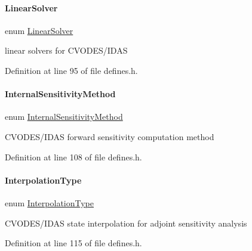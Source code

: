 \paragraph{\texorpdfstring{Linear\+Solver}{LinearSolver}}
{\footnotesize\ttfamily enum \mbox{\hyperlink{namespaceamici_a1a6a4776314a0843143e5631c3ce21a7}{Linear\+Solver}}\hspace{0.3cm}{\ttfamily [strong]}}

linear solvers for C\+V\+O\+D\+E\+S/\+I\+D\+AS 

Definition at line 95 of file defines.\+h.

\mbox{\label{namespaceamici_aa444c52f0a5638d68702d1ec92f8db87}} 
\paragraph{\texorpdfstring{Internal\+Sensitivity\+Method}{InternalSensitivityMethod}}
{\footnotesize\ttfamily enum \mbox{\hyperlink{namespaceamici_aa444c52f0a5638d68702d1ec92f8db87}{Internal\+Sensitivity\+Method}}\hspace{0.3cm}{\ttfamily [strong]}}

C\+V\+O\+D\+E\+S/\+I\+D\+AS forward sensitivity computation method 

Definition at line 108 of file defines.\+h.

\mbox{\label{namespaceamici_a8472f01c511d77bbfb981a46618ea1ea}} 
\paragraph{\texorpdfstring{Interpolation\+Type}{InterpolationType}}
{\footnotesize\ttfamily enum \mbox{\hyperlink{namespaceamici_a8472f01c511d77bbfb981a46618ea1ea}{Interpolation\+Type}}\hspace{0.3cm}{\ttfamily [strong]}}

C\+V\+O\+D\+E\+S/\+I\+D\+AS state interpolation for adjoint sensitivity analysis 

Definition at line 115 of file defines.\+h.

\mbox{\label{namespaceamici_a9ebe272482a8e073efe7078b7e96e8bc}} 
